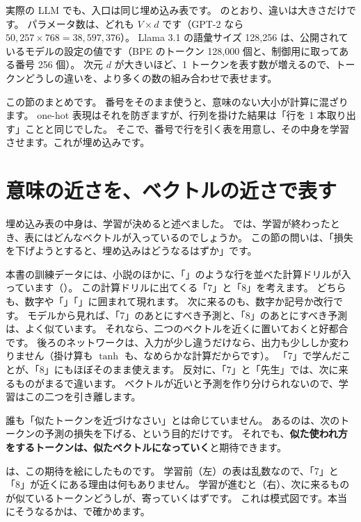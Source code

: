 実際の LLM でも、入口は同じ埋め込み表です。
のとおり、違いは大きさだけです。
パラメータ数は、どれも $V\times d$ です（GPT-2 なら $50{,}257\times768=38{,}597{,}376$）。
Llama 3.1 の語彙サイズ 128,256 は、公開されているモデルの設定の値です（BPE のトークン 128,000 個と、制御用に取ってある番号 256 個）。
次元 $d$ が大きいほど、1 トークンを表す数が増えるので、トークンどうしの違いを、より多くの数の組み合わせで表せます。

この節のまとめです。
番号をそのまま使うと、意味のない大小が計算に混ざります。
one-hot 表現はそれを防ぎますが、行列を掛けた結果は「行を 1 本取り出す」ことと同じでした。
そこで、番号で行を引く表を用意し、その中身を学習させます。これが埋め込みです。

\section{意味の近さを、ベクトルの近さで表す}\label{sec:emb-meaning}

埋め込み表の中身は、学習が決めると述べました。
では、学習が終わったとき、表にはどんなベクトルが入っているのでしょうか。
この節の問いは、「損失を下げようとすると、埋め込みはどうなるはずか」です。

本書の訓練データには、小説のほかに、「」のような行を並べた計算ドリルが入っています（）。
この計算ドリルに出てくる「7」と「8」を考えます。
どちらも、数字や「\code{+}」「\code{=}」に囲まれて現れます。
次に来るのも、数字か記号か改行です。
モデルから見れば、「7」のあとにすべき予測と、「8」のあとにすべき予測は、よく似ています。
それなら、二つのベクトルを近くに置いておくと好都合です。
後ろのネットワークは、入力が少し違うだけなら、出力も少ししか変わりません（掛け算も $\tanh$ も、なめらかな計算だからです）。
「7」で学んだことが、「8」にもほぼそのまま使えます。
反対に、「7」と「先生」では、次に来るものがまるで違います。
ベクトルが近いと予測を作り分けられないので、学習はこの二つを引き離します。

誰も「似たトークンを近づけなさい」とは命じていません。
あるのは、次のトークンの予測の損失を下げる、という目的だけです。
それでも、\textbf{似た使われ方をするトークンは、似たベクトルになっていく}と期待できます。

は、この期待を絵にしたものです。
学習前（左）の表は乱数なので、「7」と「8」が近くにある理由は何もありません。
学習が進むと（右）、次に来るものが似ているトークンどうしが、寄っていくはずです。
これは模式図です。本当にそうなるかは、で確かめます。

